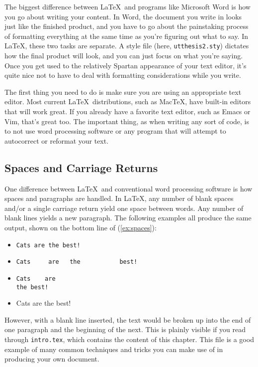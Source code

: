 The biggest difference between \LaTeX ~and programs like Microsoft Word is how
you go about writing your content. In Word, the document you write in looks
just like the finished product, and you have to go about the painstaking
process of formatting everything at the same time as you're figuring out what
to say. In \LaTeX, these two tasks are separate. A style file (here,
{\tt utthesis2.sty}) dictates how the final product will look, and you can
just focus on what you're saying. Once you get used to the relatively Spartan
appearance of your text editor, it's quite nice not to have to deal with
formatting considerations while you write.

The first thing you need to do is make sure you are using an appropriate text
editor. Most current \LaTeX ~distributions, such as MacTeX, have
built-in editors that will work great. If you already have a favorite text
editor, such as Emacs or Vim, that's great too. The important thing, as when
writing any sort of code, is to not use word processing software or any program
that will attempt to autocorrect or reformat your text.

\subsection{Spaces and Carriage Returns}
One difference between \LaTeX ~and conventional word
processing software is how spaces and paragraphs are handled. In \LaTeX, 
any number of blank spaces and/or a single carriage return yield one space
between words. Any number of blank lines yields a new paragraph. The following
examples all produce the same output, shown on the bottom line of
(\ref{ex:spaces}):

\begin{exe}
  \ex \label{ex:spaces}
  \begin{itemize}
    \item \verb+Cats are the best!+
    \item \verb+Cats     are   the           best!+
    \item \verb+Cats    are+ \\ \verb+the best!+
    \item Cats are the best!
  \end{itemize}
\end{exe} 
%
However, with a blank line inserted, the text would be broken up into the
end of one paragraph and the beginning of the next. This is plainly visible
if you read through {\tt intro.tex}, which contains the content of this chapter.
This file is a good example of many common techniques and tricks you can make
use of in producing your own document.

